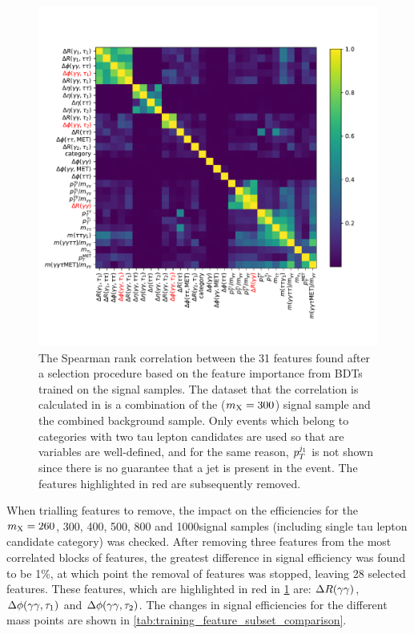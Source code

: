 \begin{figure}
    \centering
    \includegraphics[width=\textwidth]{Figures/Dihiggs/categorisation/feature_correlation.pdf}
    \caption[Correlation Between the Most Important Training Features]{The Spearman rank correlation between the 31 features found after a selection procedure based on the feature importance from BDTs trained on the \XTwoHH signal samples. The dataset that the correlation is calculated in is a combination of the \XTwoHH ($m_{\mathrm{X}}=300$\GeV) signal sample and the combined background sample. Only events which belong to categories with two tau lepton candidates are used so that are variables are well-defined, and for the same reason, $p_T^{j_1}$ is not shown since there is no guarantee that a jet is present in the event. The features highlighted in red are subsequently removed.}\label{fig:feature_correlation}
\end{figure}

When trialling features to remove, the impact on the efficiencies for the $m_{\mathrm{X}}=260$, 300, 400, 500, 800 and 1000\GeV signal samples (including single tau lepton candidate category) was checked. After removing three features from the most correlated blocks of features, the greatest difference in signal efficiency was found to be 1\%, at which point the removal of features was stopped, leaving 28 selected features. These features, which are highlighted in red in \cref{fig:feature_correlation} are: $\Delta R(\gamma\gamma)$, $\Delta \phi(\gamma\gamma,\tau_1)$ and $\Delta \phi(\gamma\gamma, \tau_2)$. The changes in signal efficiencies for the different mass points are shown in \cref{tab:training_feature_subset_comparison}.

